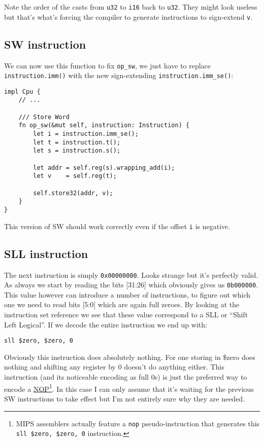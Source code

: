 \documentclass[a4paper]{article}
\newcommand{\code}[1] {\texttt{#1}}
\begin{document}
Note the order of the casts from \code{u32} to \code{i16} back to
\code{u32}. They might look useless but that's what's forcing the
compiler to generate instructions to sign-extend \code{v}.

\subsection{SW instruction}

We can now use this function to fix \code{op\_sw}, we just have to
replace \code{instruction.imm()} with the new sign-extending
\code{instruction.imm\_se()}:

\begin{lstlisting}
impl Cpu {
    // ...

    /// Store Word
    fn op_sw(&mut self, instruction: Instruction) {
        let i = instruction.imm_se();
        let t = instruction.t();
        let s = instruction.s();

        let addr = self.reg(s).wrapping_add(i);
        let v    = self.reg(t);

        self.store32(addr, v);
    }
}
\end{lstlisting}

This version of SW should work correctly even if the offset \code{i}
is negative.

\subsection{SLL instruction}

The next instruction is simply \code{0x00000000}. Looks strange but
it's perfectly valid. As always we start by reading the bits [31:26]
which obviously gives us \code{0b000000}. This value however can
introduce a number of instructions, to figure out which one we need to
read bits [5:0] which are again full zeroes. By looking at the
instruction set reference we see that these value correspond to a SLL
or ``Shift Left Logical''. If we decode the entire instruction we end
up with:

\begin{lstlisting}[language=assembly]
sll $zero, $zero, 0
\end{lstlisting}

Obviously this instruction does absolutely nothing. For one storing in
\$zero does nothing and shifting any register by 0 doesn't do anything
either. This instruction (and its noticeable encoding as full 0s) is
just the preferred way to encode a
\href{https://en.wikipedia.org/wiki/NOP}{NOP}\footnote{MIPS assemblers
  actually feature a \code{nop} pseudo-instruction that generates
  this \mbox{\code{sll \$zero, \$zero, 0}} instruction.}. In this case I can
only assume that it's waiting for the previous SW instructions to take
effect but I'm not entirely sure why they are needed.
\end{document}
